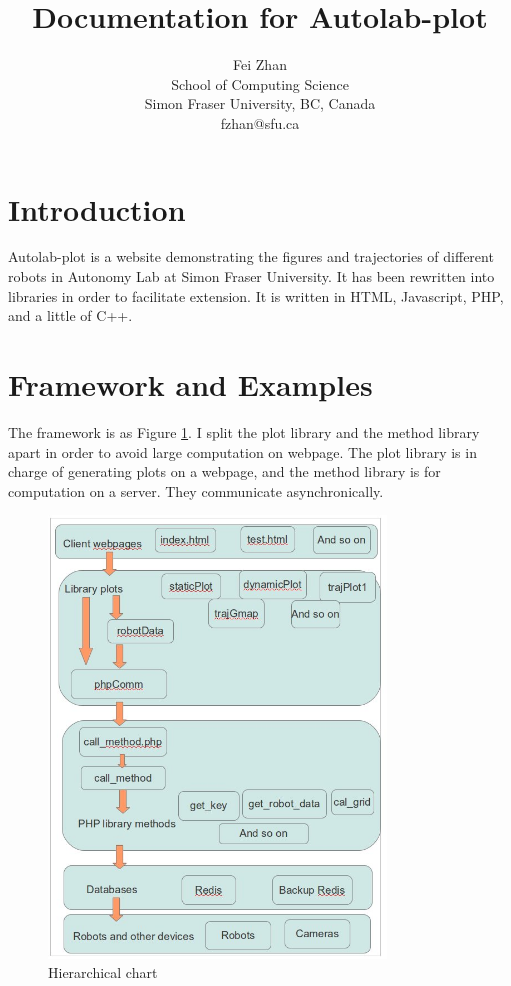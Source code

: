 \documentclass{article}
\begin{document}
\title{Documentation for Autolab-plot}
\author{Fei Zhan \\ School of Computing Science \\ Simon Fraser University, BC, Canada \\ fzhan@sfu.ca}
\maketitle

\section{Introduction}
Autolab-plot is a website demonstrating the figures and trajectories of different robots in Autonomy Lab at Simon Fraser University.
It has been rewritten into libraries in order to facilitate extension.
It is written in HTML, Javascript, PHP, and a little of C++.

\section{Framework and Examples}
The framework is as Figure \ref{hier}.
I split the plot library and the method library apart in order to avoid large computation on webpage.
The plot library is in charge of generating plots on a webpage, and the method library is for computation on a server.
They communicate asynchronically.

\begin{figure}
\centering
\includegraphics[width=0.8\textwidth]{diagram.jpg}
\caption{Hierarchical chart}
\label{hier}
\end{figure}
\end{document}
